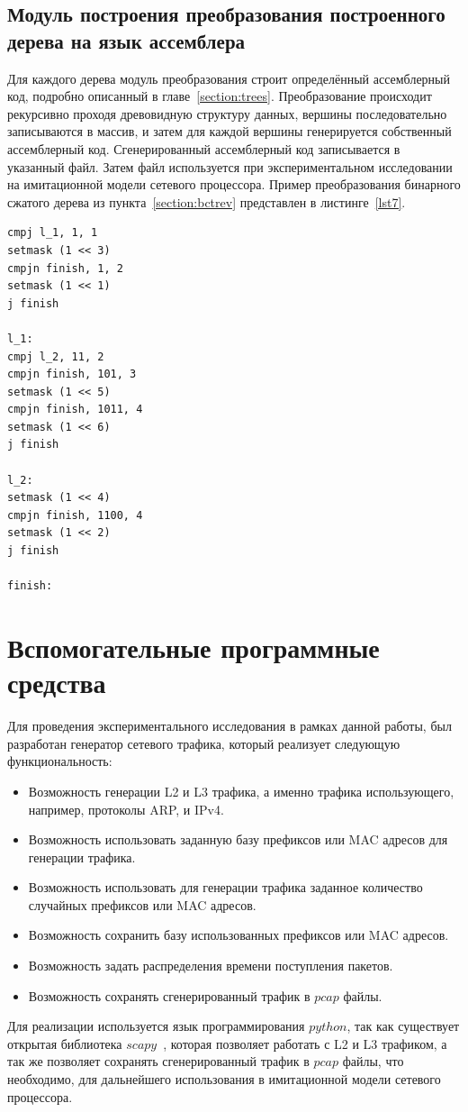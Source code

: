 \documentclass[a4paper, 12pt, titlepage, finall]{extreport}
\begin{document}
        \subsection{Модуль построения преобразования построенного дерева на язык ассемблера}
            Для каждого дерева модуль преобразования строит определённый ассемблерный код, подробно описанный в главе~\ref{section:trees}.
            Преобразование происходит рекурсивно проходя древовидную структуру данных, вершины последовательно записываются в массив, и затем
            для каждой вершины генерируется собственный ассемблерный код.
            Сгенерированный ассемблерный код записывается в указанный файл. Затем файл используется при экспериментальном исследовании на имитационной модели сетевого процессора.
            Пример преобразования бинарного сжатого дерева из пункта~\ref{section:bctrev} представлен в листинге~\ref{lst7}.\\
\begin{lstlisting}[frame=lines, caption=Пример бинарного сжатого дерева на языке ассемблера., label=lst7]
cmpj l_1, 1, 1
setmask (1 << 3)
cmpjn finish, 1, 2
setmask (1 << 1)
j finish

l_1:
cmpj l_2, 11, 2
cmpjn finish, 101, 3
setmask (1 << 5)
cmpjn finish, 1011, 4
setmask (1 << 6)
j finish

l_2:
setmask (1 << 4)
cmpjn finish, 1100, 4
setmask (1 << 2)
j finish

finish:
\end{lstlisting}

    \section{Вспомогательные программные средства}
        Для проведения экспериментального исследования в рамках данной работы, был разработан генератор сетевого трафика,
        который реализует следующую функциональность:
        \begin{itemize}
            \item Возможность генерации L2 и L3 трафика, а именно трафика использующего, например, протоколы ARP, и IPv4.
            \item Возможность использовать заданную базу префиксов или MAC адресов для генерации трафика.
            \item Возможность использовать для генерации трафика заданное количество случайных префиксов или MAC адресов.
            \item Возможность сохранить базу использованных префиксов или MAC адресов.
            \item Возможность задать распределения времени поступления пакетов.
            \item Возможность сохранять сгенерированный трафик в $pcap$ файлы.
        \end{itemize}
        Для реализации используется язык программирования $python$, так как существует открытая библиотека $scapy$~\cite{scapy:1}, которая позволяет работать с L2 и L3 трафиком,
        а так же позволяет сохранять сгенерированный трафик в $pcap$ файлы, что необходимо, для дальнейшего использования в имитационной модели сетевого процессора.
\end{document}
